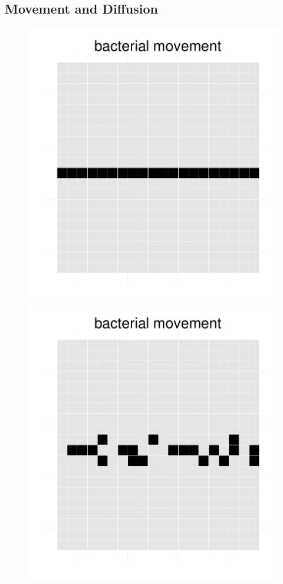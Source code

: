 \subsection{Movement and Diffusion}

\begin{figure}[h]
  \centering
  \begin{minipage}[t]{0.3\textwidth}
    \includegraphics[width=\textwidth]{mov1.pdf}
  \end{minipage}
  \begin{minipage}[t]{0.3\textwidth}
    \includegraphics[width=\textwidth]{mov2.pdf}

\end{minipage}
\end{figure}
